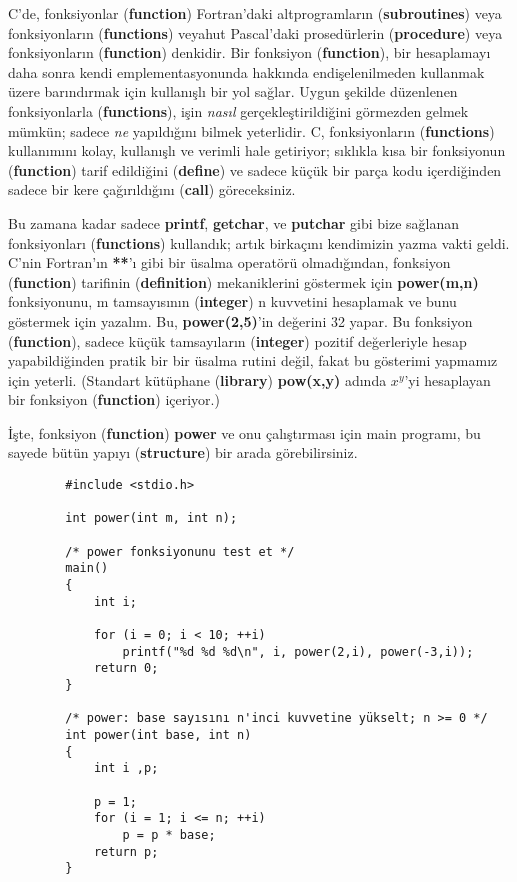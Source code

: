 \documentclass[a4paper,12pt,oneside]{book}
\begin{document}
C'de, fonksiyonlar (\textbf{function}) Fortran'daki altprogramların (\textbf{subroutines}) veya fonksiyonların (\textbf{functions}) veyahut Pascal'daki prosedürlerin (\textbf{procedure}) veya fonksiyonların (\textbf{function}) denkidir. Bir fonksiyon (\textbf{function}), bir hesaplamayı daha sonra kendi emplementasyonunda hakkında endişelenilmeden kullanmak üzere barındırmak için kullanışlı bir yol sağlar. Uygun şekilde düzenlenen fonksiyonlarla (\textbf{functions}), işin \textit{nasıl} gerçekleştirildiğini görmezden gelmek mümkün; sadece \textit{ne} yapıldığını bilmek yeterlidir. C, fonksiyonların (\textbf{functions}) kullanımını kolay, kullanışlı ve verimli hale getiriyor; sıklıkla kısa bir fonksiyonun (\textbf{function}) tarif edildiğini (\textbf{define}) ve sadece küçük bir parça kodu içerdiğinden sadece bir kere çağırıldığını (\textbf{call}) göreceksiniz.
\par Bu zamana kadar sadece \textbf{printf}, \textbf{getchar}, ve \textbf{putchar} gibi bize sağlanan fonksiyonları (\textbf{functions}) kullandık; artık birkaçını kendimizin yazma vakti geldi. C'nin Fortran'ın \textbf{**}'ı gibi bir üsalma operatörü olmadığından, fonksiyon (\textbf{function}) tarifinin (\textbf{definition}) mekaniklerini göstermek için \textbf{power(m,n)} fonksiyonunu, m tamsayısının (\textbf{integer}) n kuvvetini hesaplamak ve bunu göstermek için yazalım. Bu, \textbf{power(2,5)}'in değerini 32 yapar. Bu fonksiyon (\textbf{function}), sadece küçük tamsayıların (\textbf{integer}) pozitif değerleriyle hesap yapabildiğinden pratik bir bir üsalma rutini değil, fakat bu gösterimi yapmamız için yeterli. (Standart kütüphane (\textbf{library}) \textbf{pow(x,y)} adında \textbf{$x^y$}'yi hesaplayan bir fonksiyon (\textbf{function}) içeriyor.)
\par İşte, fonksiyon (\textbf{function}) \textbf{power} ve onu çalıştırması için main programı, bu sayede bütün yapıyı (\textbf{structure}) bir arada görebilirsiniz.
\begin{lstlisting}
		#include <stdio.h>

		int power(int m, int n);

		/* power fonksiyonunu test et */
		main()
		{
			int i;

			for (i = 0; i < 10; ++i)
				printf("%d %d %d\n", i, power(2,i), power(-3,i));
			return 0;
		}

		/* power: base sayısını n'inci kuvvetine yükselt; n >= 0 */
		int power(int base, int n)
		{
			int i ,p;

			p = 1;
			for (i = 1; i <= n; ++i)
				p = p * base;
			return p;
		}
\end{lstlisting}
\end{document}

